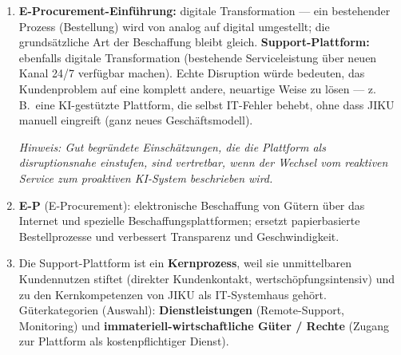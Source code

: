 \documentclass[11pt, a4paper]{article}
\begin{document}
\begin{enumerate}[label=(\alph*)]
  \item \textbf{E-Procurement-Einführung:} digitale Transformation --- ein bestehender
  Prozess (Bestellung) wird von analog auf digital umgestellt; die grundsätzliche Art der
  Beschaffung bleibt gleich. \textbf{Support-Plattform:} ebenfalls digitale Transformation
  (bestehende Serviceleistung über neuen Kanal 24/7 verfügbar machen). Echte Disruption
  würde bedeuten, das Kundenproblem auf eine komplett andere, neuartige Weise zu lösen ---
  z.\,B.\ eine KI-gestützte Plattform, die selbst IT-Fehler behebt, ohne dass JIKU manuell
  eingreift (ganz neues Geschäftsmodell).

  \textit{Hinweis: Gut begründete Einschätzungen, die die Plattform als disruptions\-nahe einstufen,
  sind vertretbar, wenn der Wechsel vom reaktiven Service zum proaktiven KI-System beschrieben wird.}

  \item \textbf{E-P} (E-Procurement): elektronische Beschaffung von Gütern über das Internet
  und spezielle Beschaffungsplattformen; ersetzt papierbasierte Bestellprozesse und verbessert
  Transparenz und Geschwindigkeit.

  \item Die Support-Plattform ist ein \textbf{Kernprozess}, weil sie unmittelbaren Kundennutzen
  stiftet (direkter Kundenkontakt, wertschöpfungsintensiv) und zu den Kernkompetenzen von JIKU
  als IT-Systemhaus gehört. Güterkategorien (Auswahl): \textbf{Dienstleistungen} (Remote-Support,
  Monitoring) und \textbf{immateriell-wirtschaftliche Güter / Rechte} (Zugang zur Plattform als
  kostenpflichtiger Dienst).
\end{enumerate}
\end{document}

